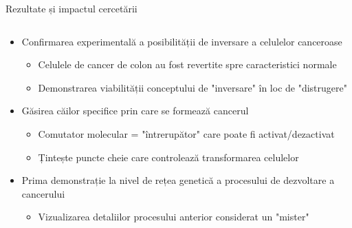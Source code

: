 \documentclass{beamer}
\begin{document}
	\begin{frame}[allowframebreaks]{Rezultate și impactul cercetării}
		\begin{columns}
			\begin{column}{\textwidth}
				\begin{itemize}
					\item Confirmarea experimentală a posibilității de inversare a celulelor canceroase
					\begin{itemize}
						\item Celulele de cancer de colon au fost revertite spre caracteristici normale
						\item Demonstrarea viabilității conceptului de "inversare" în loc de "distrugere"
					\end{itemize}
					\item Găsirea căilor specifice prin care se formează cancerul
					\begin{itemize}
						\item Comutator molecular = "întrerupător" care poate fi activat/dezactivat
						\item Țintește puncte cheie care controlează transformarea celulelor
					\end{itemize}
					\item Prima demonstrație la nivel de rețea genetică a procesului de dezvoltare a cancerului
					\begin{itemize}
						\item Vizualizarea detaliilor procesului anterior considerat un "mister"
					\end{itemize}
				\end{itemize}
			\end{column}
		\end{columns}
		
		\framebreak
		

\end{frame}
\end{document}
